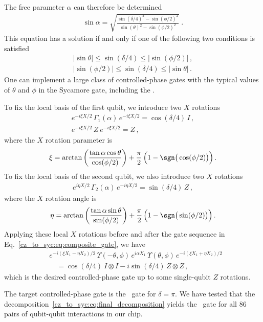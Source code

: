 The free parameter $\alpha$ can therefore be determined
\begin{align}\label{cz_to_syc:eq:alpha}
\sin\alpha = \sqrt{\frac{\sin(\delta/4)^2 - \sin(\phi/2)^2}{\sin(\theta)^2-\sin(\phi/2)^2}}\;.
\end{align}
This equation has a solution if and only if one of the following two conditions is satisfied
\begin{align}
\lvert\sin\theta\rvert \leq \sin(\delta/4) \leq \lvert\sin(\phi/2)\rvert\,,\\[3pt]
\lvert\sin(\phi/2)\rvert\leq \sin(\delta/4)  \leq \lvert\sin\theta\rvert \,.
\end{align}
One can implement a large class of controlled-phase gates with the typical values of $\theta$ and $\phi$ in the Sycamore gate, including the \CZ.

To fix the local basis of the first qubit, we introduce two $X$ rotations
\begin{gather}
 e^{-i\xi X/2}\, \Gamma_1(\alpha)\, e^{-i\xi X/2} = \cos(\delta/4)\,I\,,\\[2pt]
  e^{-i\xi X/2}\, Z\:  e^{-i\xi X/2}=  Z\,,
\end{gather}
where the $X$ rotation parameter is 
\begin{align}
 \xi = \arctan \bigg(\frac{\tan\alpha \cos\theta}{\cos(\phi/2)}\bigg) + \frac{\pi}{2}\, \Big(1-\sgn\big(\cos(\phi/2)\big)\Big)\,.
\end{align}
To fix the local basis of the second qubit, we also introduce two $X$ rotations
\begin{align}
 e^{i\eta X/2}\, \Gamma_2(\alpha)\, e^{-i\eta X/2}= \sin(\delta/4)\,Z\,,
\end{align}
where the $X$ rotation angle is
\begin{align}
\eta = \arctan \bigg(\frac{\tan\alpha \sin\theta}{\sin(\phi/2)}\bigg) + \frac{\pi}{2}\, \Big(1-\sgn\big(\sin(\phi/2)\big)\Big)\,.
\end{align}
Applying these local $X$ rotations before and after the gate sequence in Eq.~\eqref{cz_to_syc:eq:composite_gate}, we have
\begin{align}
 & e^{-i(\xi X_1 - \eta X_2)/2}\,\Upsilon(-\theta, \phi)\, e^{i\alpha X_1}\, \Upsilon(\theta, \phi)\, e^{-i(\xi X_1 + \eta X_2)/2}\nonumber\\[2pt]
 & \quad= \cos(\delta/4)\: I \otimes I - i\sin(\delta/4)\, Z\otimes Z\,,\label{cz_to_syc:eq:final_decomposition}
\end{align}
which is the desired controlled-phase gate up to some single-qubit $Z$ rotations.  

The target controlled-phase gate is the \CZ\ gate for $\delta = \pi$.  We have tested that the decomposition~\eqref{cz_to_syc:eq:final_decomposition} yields the \CZ\ gate for all 86 pairs of qubit-qubit interactions in our chip.
